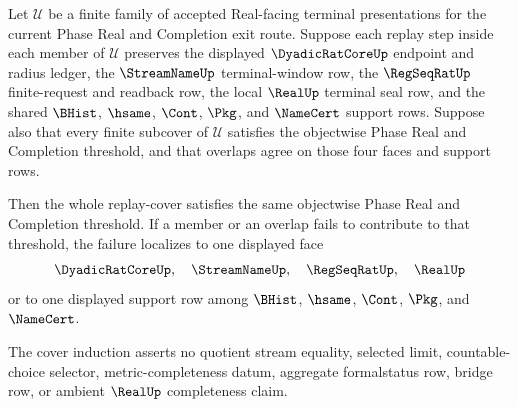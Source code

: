 \begin{theorem}
\label{thm:real-l10-terminal-support-cover-induction}
Let $\mathcal{U}$ be a finite family of accepted Real-facing terminal
presentations for the current Phase Real and Completion exit route. Suppose
each replay step inside each member of $\mathcal{U}$ preserves the displayed
$\DyadicRatCoreUp$ endpoint and radius ledger, the $\StreamNameUp$
terminal-window row, the $\RegSeqRatUp$ finite-request and readback row, the
local $\RealUp$ terminal seal row, and the shared $\BHist$, $\hsame$, $\Cont$,
$\Pkg$, and $\NameCert$ support rows. Suppose also that every finite subcover
of $\mathcal{U}$ satisfies the objectwise Phase Real and Completion threshold,
and that overlaps agree on those four faces and support rows.

Then the whole replay-cover satisfies the same objectwise Phase Real and
Completion threshold. If a member or an overlap fails to contribute to that
threshold, the failure localizes to one displayed face
$$
\DyadicRatCoreUp,\quad \StreamNameUp,\quad \RegSeqRatUp,\quad \RealUp
$$
or to one displayed support row among $\BHist$, $\hsame$, $\Cont$, $\Pkg$, and
$\NameCert$.

The cover induction asserts no quotient stream equality, selected limit,
countable-choice selector, metric-completeness datum, aggregate formalstatus
row, bridge row, or ambient $\RealUp$ completeness claim.
\end{theorem}
